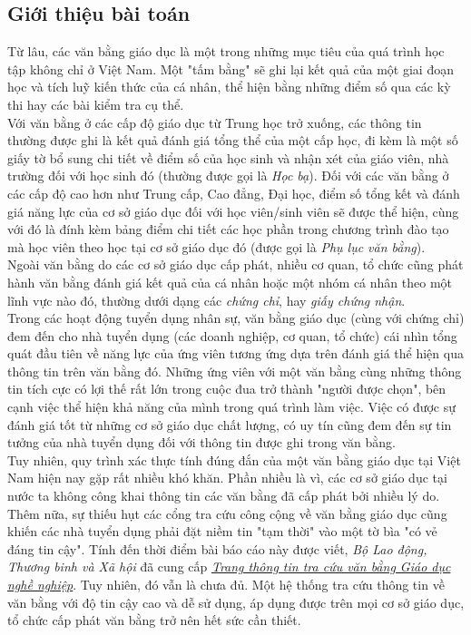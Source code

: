 \subsection{Giới thiệu bài toán}

Từ lâu, các văn bằng giáo dục là một trong những mục tiêu của quá trình học tập không chỉ ở Việt Nam. Một "tấm bằng" sẽ ghi lại kết quả của một giai đoạn học và tích luỹ kiến thức của cá nhân, thể hiện bằng những điểm số qua các kỳ thi hay các bài kiểm tra cụ thể.\\

Với văn bằng ở các cấp độ giáo dục từ Trung học trở xuống, các thông tin thường được ghi là kết quả đánh giá tổng thể của một cấp học, đi kèm là một số giấy tờ bổ sung chi tiết về điểm số của học sinh và nhận xét của giáo viên, nhà trường đối với học sinh đó (thường được gọi là \textit{Học bạ}). Đối với các văn bằng ở các cấp độ cao hơn như Trung cấp, Cao đẳng, Đại học, điểm số tổng kết và đánh giá năng lực của cơ sở giáo dục đối với học viên/sinh viên sẽ được thể hiện, cùng với đó là đính kèm bảng điểm chi tiết các học phần trong chương trình đào tạo mà học viên theo học tại cơ sở giáo dục đó (được gọi là \textit{Phụ lục văn bằng}).\\

Ngoài văn bằng do các cơ sở giáo dục cấp phát, nhiều cơ quan, tổ chức cũng phát hành văn bằng đánh giá kết quả của cá nhân hoặc một nhóm cá nhân theo một lĩnh vực nào đó, thường dưới dạng các \textit{chứng chỉ}, hay \textit{giấy chứng nhận}.\\

Trong các hoạt động tuyển dụng nhân sự, văn bằng giáo dục (cùng với chứng chỉ) đem đến cho nhà tuyển dụng (các doanh nghiệp, cơ quan, tổ chức) cái nhìn tổng quát đầu tiên về năng lực của ứng viên tương ứng dựa trên đánh giá thể hiện qua thông tin trên văn bằng đó. Những ứng viên với một văn bằng cùng những thông tin tích cực có lợi thế rất lớn trong cuộc đua trở thành "người được chọn", bên cạnh việc thể hiện khả năng của mình trong quá trình làm việc. Việc có được sự đánh giá tốt từ những cơ sở giáo dục chất lượng, có uy tín cũng đem đến sự tin tưởng của nhà tuyển dụng đối với thông tin được ghi trong văn bằng.\\

Tuy nhiên, quy trình xác thực tính đúng đắn của một văn bằng giáo dục tại Việt Nam hiện nay gặp rất nhiều khó khăn. Phần nhiều là vì, các cơ sở giáo dục tại nước ta không công khai thông tin các văn bằng đã cấp phát bởi nhiều lý do. Thêm nữa, sự thiếu hụt các cổng tra cứu công cộng về văn bằng giáo dục cũng khiến các nhà tuyển dụng phải đặt niềm tin "tạm thời" vào một tờ bìa "có vẻ đáng tin cậy". Tính đến thời điểm bài báo cáo này được viết, \textit{Bộ Lao động, Thương binh và Xã hội} đã cung cấp \href{https://vanbang.gdnn.gov.vn/}{\textit{Trang thông tin tra cứu văn bằng Giáo dục nghề nghiệp}}. Tuy nhiên, đó vẫn là chưa đủ. Một hệ thống tra cứu thông tin về văn bằng với độ tin cậy cao và dễ sử dụng, áp dụng được trên mọi cơ sở giáo dục, tổ chức cấp phát văn bằng trở nên hết sức cần thiết.

